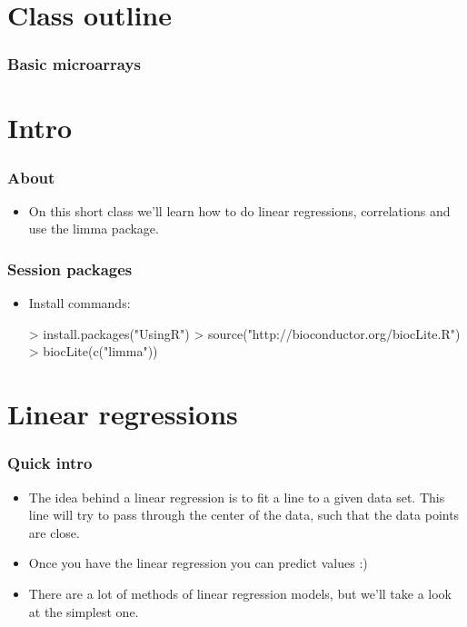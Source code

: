 




\usepackage{Sweave}


\begin{frame}[allowframebreaks]
  \titlepage
\end{frame}

\section*{Class outline}

\begin{frame}[allowframebreaks]
  \frametitle{Basic microarrays}
  \tableofcontents[hideallsubsections]
\end{frame}

\section{Intro}

\begin{frame}[allowframebreaks]
  \frametitle{About}
  \begin{itemize}
  \item On this short class we'll learn how to do linear regressions, correlations and use the limma package.
  \end{itemize}
\end{frame}

\begin{frame}
  \frametitle{Session packages}
  \begin{itemize}
  \item Install commands:
\begin{Schunk}
\begin{Sinput}
> install.packages("UsingR")
> source("http://bioconductor.org/biocLite.R")
> biocLite(c("limma"))
\end{Sinput}
\end{Schunk}
  \end{itemize}
\end{frame}

\section{Linear regressions}

\begin{frame}[allowframebreaks]
  \frametitle{Quick intro}
  \begin{itemize}
  \item The idea behind a linear regression is to fit a line to a given data set. This line will try to pass through the center of the data, such that the data points are close.
  \item Once you have the linear regression you can predict values :)
  \item There are a lot of methods of linear regression models, but we'll take a look at the simplest one.
  \end{itemize}
\end{frame}


